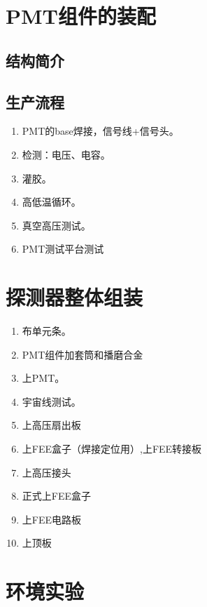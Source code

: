 \section{PMT组件的装配}
\label{sec:construction:pmt_assembly}
\subsection{结构简介}
\subsection{生产流程}
\begin{enumerate}
	\item PMT的base焊接，信号线+信号头。
	\item 检测：电压、电容。
	\item 灌胶。
	\item 高低温循环。
	\item 真空高压测试。
	\item PMT测试平台测试
\end{enumerate}

\section{探测器整体组装}
\label{sec:construction:psd_assembly}
\begin{enumerate}
	\item 布单元条。
	\item PMT组件加套筒和播磨合金
	\item 上PMT。
	\item 宇宙线测试。
	\item 上高压扇出板
	\item 上FEE盒子（焊接定位用）,上FEE转接板
	\item 上高压接头
	\item 正式上FEE盒子
	\item 上FEE电路板
	\item 上顶板
\end{enumerate}

\section{环境实验}
